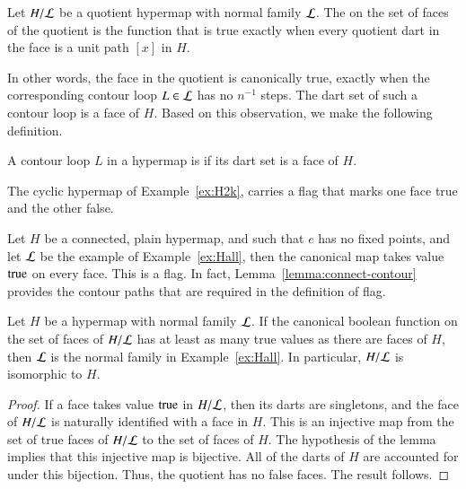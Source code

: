 \begin{definition} Let $H/{\cal L}$ be a
quotient hypermap with normal family $\cal L$.  The
 on the set of faces of the
quotient is the function that is true exactly when every quotient dart in the
face is a unit path $[x]$ in $H$.  
%
\end{definition}

In other words, the face in the quotient is canonically true, exactly when the corresponding
contour loop $L\in {\cal L}$ has no $n^{-1}$ steps.  The dart set of such
a contour loop is a face of $H$.  Based on this observation, we make the following definition.

\begin{definition}
A contour loop $L$ in a hypermap is  if its dart set is a face of $H$.
\end{definition}

\begin{example} 
The cyclic hypermap of Example~\ref{ex:H2k}, carries a
flag that marks one face true and the other false.
\end{example}

\begin{example}\label{ex:Hall-flag} 
Let $H$ be a connected, plain hypermap, and such that
$e$ has no fixed points, and let $\cal L$ be the example of
Example~\ref{ex:Hall}, then the canonical map takes value
${\operatorname{true}}$ on every face.  This is a flag. In fact,
Lemma~\ref{lemma:connect-contour} provides the contour paths that
are required in the definition of flag.
\end{example}

\begin{lemma}  
Let $H$ be a hypermap with normal family ${\cal L}$. If the
canonical boolean function on the set of faces of $H/{\cal L}$ has
at least as many true values as there are faces of $H$, then $\cal
L$ is the normal family in Example~\ref{ex:Hall}. In particular,
$H/{\cal L}$ is isomorphic to $H$.
\end{lemma}

\begin{proof} If a face takes value ${\operatorname{true}}$ in $H/{\cal L}$, then
its darts are singletons, and the face of $H/{\cal L}$ is naturally
identified with a face in $H$.  This is an injective map from the
set of true faces of $H/{\cal L}$ to the set of faces of $H$.  The
hypothesis of the lemma implies that this injective map is
bijective. All of the darts of $H$ are accounted for under this
bijection. Thus, the quotient has no false faces.  The result
follows.
\end{proof}

